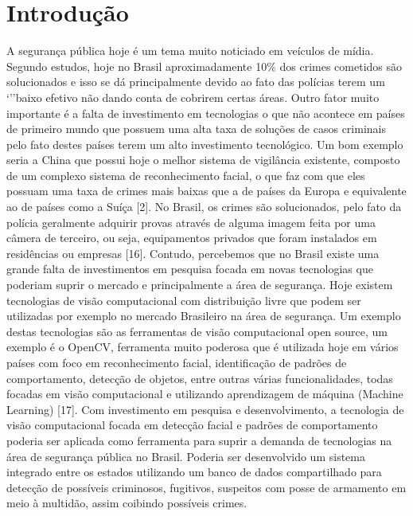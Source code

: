 
\chapter*[Introdução]{Introdução}

A segurança pública hoje é um tema muito noticiado em veículos de mídia. Segundo estudos, hoje no Brasil aproximadamente 10\% dos crimes cometidos são solucionados \cite{um} e isso se dá principalmente devido ao fato das polícias terem um ‘’’baixo efetivo não dando conta de cobrirem certas áreas. Outro fator muito importante é a falta de investimento em tecnologias o que não acontece em países de primeiro mundo que possuem uma alta taxa de soluções de casos criminais pelo fato destes países terem um alto investimento tecnológico. Um bom exemplo seria a China que possui hoje o melhor sistema de vigilância existente, composto de um complexo sistema de reconhecimento facial, o que faz com que eles possuam uma taxa de crimes mais baixas que a de países da Europa e equivalente ao de países como a Suíça [2].  
No Brasil, os crimes são solucionados, pelo fato da polícia geralmente adquirir provas através de alguma imagem feita por uma câmera de terceiro, ou seja, equipamentos privados que foram instalados em residências ou empresas [16]. Contudo, percebemos que no Brasil existe uma grande falta de investimentos em pesquisa focada em novas tecnologias que poderiam suprir o mercado e principalmente a área de segurança. 
Hoje existem tecnologias de visão computacional com distribuição livre que podem ser utilizadas por exemplo no mercado Brasileiro na área de segurança. Um exemplo destas tecnologias são as ferramentas de visão computacional open source, um exemplo é o OpenCV, ferramenta muito poderosa que é utilizada hoje em vários países com foco em reconhecimento facial, identificação de padrões de comportamento, detecção de objetos, entre outras várias funcionalidades, todas focadas em visão computacional e utilizando aprendizagem de máquina (Machine Learning) [17].  
Com investimento em pesquisa e desenvolvimento, a tecnologia de visão computacional focada em detecção facial e padrões de comportamento poderia ser aplicada como ferramenta para suprir a demanda de tecnologias na área de segurança pública no Brasil. Poderia ser desenvolvido um sistema integrado entre os estados utilizando um banco de dados compartilhado para detecção de possíveis criminosos, fugitivos, suspeitos com posse de armamento em meio à multidão, assim coibindo possíveis crimes. 
